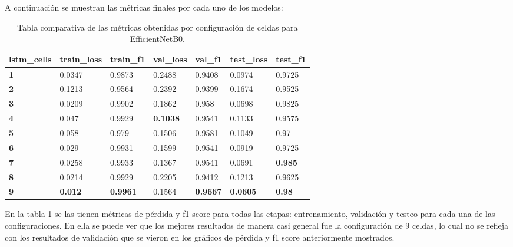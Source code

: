 A continuación se muestran las métricas finales por cada uno de 
los modelos:

\begin{table}[h!]
\centering
\begin{tabular}{|l|l|l|l|l|l|l|}
\hline
\textbf{lstm\_cells} & \textbf{train\_loss} & \textbf{train\_f1} & \textbf{val\_loss} & \textbf{val\_f1} & \textbf{test\_loss} & \textbf{test\_f1} \\ \hline
\textbf{1}           & 0.0347               & 0.9873             & 0.2488             & 0.9408           & 0.0974              & 0.9725            \\ \hline
\textbf{2}           & 0.1213               & 0.9564             & 0.2392             & 0.9399           & 0.1674              & 0.9525            \\ \hline
\textbf{3}           & 0.0209               & 0.9902             & 0.1862             & 0.958            & 0.0698              & 0.9825            \\ \hline
\textbf{4}           & 0.047                & 0.9929             & \textbf{0.1038}    & 0.9541           & 0.1133              & 0.9575            \\ \hline
\textbf{5}           & 0.058                & 0.979              & 0.1506             & 0.9581           & 0.1049              & 0.97              \\ \hline
\textbf{6}           & 0.029                & 0.9931             & 0.1599             & 0.9541           & 0.0919              & 0.9725            \\ \hline
\textbf{7}           & 0.0258               & 0.9933             & 0.1367             & 0.9541           & 0.0691              & \textbf{0.985}    \\ \hline
\textbf{8}           & 0.0214               & 0.9929             & 0.2205             & 0.9412           & 0.1213              & 0.9625            \\ \hline
\textbf{9}           & \textbf{0.012}       & \textbf{0.9961}    & 0.1564             & \textbf{0.9667}  & \textbf{0.0605}     & \textbf{0.98}     \\ \hline
\end{tabular}
\caption{ Tabla comparativa de las métricas obtenidas por configuración de celdas para EfficientNetB0.}
\label{table:efficientnetb0Metrics}
\end{table}


En la tabla \ref{table:efficientnetb0Metrics} se las tienen 
métricas de pérdida y f1 score para todas las etapas: 
entrenamiento, validación y testeo para cada una de las 
configuraciones. En ella se puede ver que los mejores 
resultados de manera casi general fue la configuración de 9 
celdas, lo cual no se refleja con los resultados de validación 
que se vieron en los gráficos de pérdida y f1 score anteriormente 
mostrados. 



